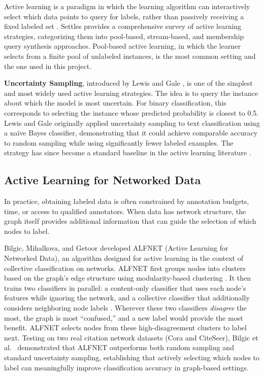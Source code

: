 \documentclass[12pt]{article}
\begin{document}
Active learning is a paradigm in which the learning algorithm can interactively select which data points to query for labels, rather than passively receiving a fixed labeled set \cite{Settles2012}. Settles \cite{Settles2012} provides a comprehensive survey of active learning strategies, categorizing them into pool-based, stream-based, and membership query synthesis approaches. Pool-based active learning, in which the learner selects from a finite pool of unlabeled instances, is the most common setting and the one used in this project.

\textbf{Uncertainty Sampling}, introduced by Lewis and Gale \cite{Lewis1994}, is one of the simplest and most widely used active learning strategies. The idea is to query the instance about which the model is most uncertain. For binary classification, this corresponds to selecting the instance whose predicted probability is closest to 0.5. Lewis and Gale \cite{Lewis1994} originally applied uncertainty sampling to text classification using a na\"ive Bayes classifier, demonstrating that it could achieve comparable accuracy to random sampling while using significantly fewer labeled examples. The strategy has since become a standard baseline in the active learning literature \cite{Settles2012}.

\subsection{Active Learning for Networked Data}

In practice, obtaining labeled data is often constrained by annotation budgets, time, or access to qualified annotators. When data has network structure, the graph itself provides additional information that can guide the selection of which nodes to label.

Bilgic, Mihalkova, and Getoor \cite{Bilgic2010} developed ALFNET (Active Learning for Networked Data), an algorithm designed for active learning in the context of collective classification on networks. ALFNET first groups nodes into clusters based on the graph's edge structure using modularity-based clustering \cite{Bilgic2010}. It then trains two classifiers in parallel: a content-only classifier that uses each node's features while ignoring the network, and a collective classifier that additionally considers neighboring node labels \cite{Bilgic2010}. Wherever these two classifiers \textit{disagree} the most, the graph is most ``confused,'' and a new label would provide the most benefit. ALFNET selects nodes from these high-disagreement clusters to label next. Testing on two real citation network datasets (Cora and CiteSeer), Bilgic et al.\ \cite{Bilgic2010} demonstrated that ALFNET outperforms both random sampling and standard uncertainty sampling, establishing that actively selecting which nodes to label can meaningfully improve classification accuracy in graph-based settings.
\end{document}
